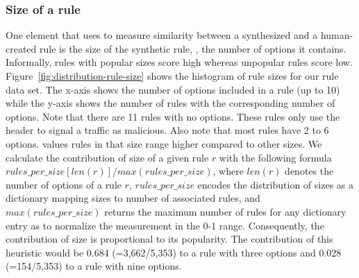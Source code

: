\documentclass[sigconf,review, anonymous]{acmart}
\begin{document}

\subsubsection{Size of a rule}
\label{sec:heuristic-size-of-rule}
One element that \tname{} uses to measure similarity between a
synthesized and a human-created rule is the size of the synthetic
rule, \ie{}, the number of options it contains. Informally, rules with
popular sizes score high whereas unpopular rules score
low. Figure~\ref{fig:distribution-rule-size} shows the histogram of
rule sizes for our rule data set. The x-axis shows the number of
options included in a rule (up to 10) while the y-axis shows the
number of rules with the corresponding number of options. Note that
there are 11 rules with no options. These rules only use the header to
signal a traffic as malicious. Also note that most rules have 2 to 6
options. \tname{} values rules in that size range higher compared to
other sizes. We calculate the contribution of size of a given rule
$r$ with the following formula $\mathit{rules\_per\_size}[\mathit{len(r)}]/\mathit{max(rules\_per\_size)}$, where $\mathit{len(r)}$ denotes the number of options of a rule $r$,
$\mathit{rules\_per\_size}$ encodes the distribution of sizes as a
dictionary mapping sizes to number of associated rules, and
$\mathit{max(rules\_per\_size)}$ returns the maximum number of rules
for any dictionary entry as to normalize the measurement in the 0-1
range. Consequently, the contribution of size is proportional to its
popularity. The contribution of this heuristic would be 0.684
(=3,662/5,353) to a rule with three options and 0.028 (=154/5,353) to
a rule with nine options.




\pgfplotsset{width=6cm,compat=1.8}
\end{document}
